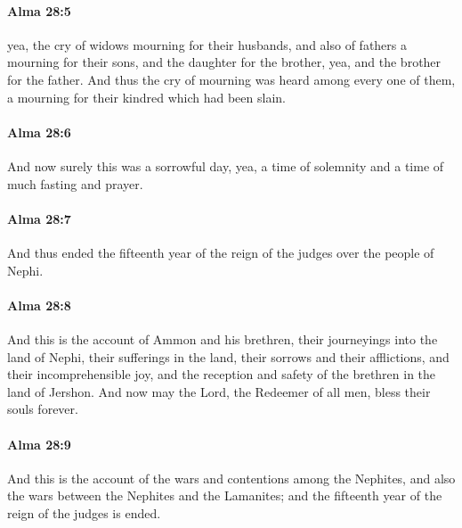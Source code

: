 		\paragraph{Alma 28:5} %
			\label{ALMA-28-5}

			yea, the cry of widows mourning for their husbands,
			and also of fathers a mourning for their sons,
			and the daughter for the brother,
			yea, and the brother for the father.
			And thus the cry of mourning was heard among every one of them,
			a mourning for their kindred which had been slain.

		\paragraph{Alma 28:6} %
			\label{ALMA-28-6}

			And now surely this was a sorrowful day,
			yea, a time of solemnity and a time of much fasting and prayer.

		\paragraph{Alma 28:7} %
			\label{ALMA-28-7}

			And thus ended the fifteenth year
			of the reign of the judges over the people of Nephi.

		\paragraph{Alma 28:8} %
			\label{ALMA-28-8}

			And this is the account of Ammon and his brethren,
			their journeyings into the land of Nephi,
			their sufferings in the land,
			their sorrows and their afflictions,
			and their incomprehensible joy,
			and the reception and safety of the brethren in the land of Jershon.
			And now may the Lord, the Redeemer of all men, bless their souls forever.

		\paragraph{Alma 28:9} %
			\label{ALMA-28-9}

			And this is the account of the wars and contentions among the Nephites,
			and also the wars between the Nephites and the Lamanites;
			and the fifteenth year of the reign of the judges is ended.


